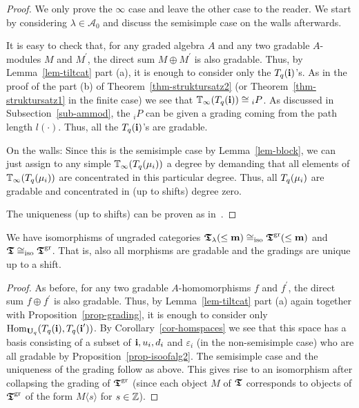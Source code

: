\begin{proof}
We only prove the $\infty$ case and leave 
the other case to the reader. We start by 
considering $\lambda\in\mathcal A_0$ and 
discuss the semisimple case on the walls afterwards.




It is easy to check that, for any graded algebra 
$A$ and any two gradable $A$-modules $M$ and 
$M^{\prime}$, the direct sum $M\oplus M^{\prime}$ 
is also gradable. Thus, by Lemma~\ref{lem-tiltcat} 
part (a), it is enough to consider only the 
$T_q({\boldsymbol{\mathrm{i}}})$'s. As in the proof of the part (b) 
of Theorem~\ref{thm-struktursatz2} 
(or Theorem~\ref{thm-struktursatz1} in the finite case) 
we see that $\mathbb{T}_{\infty}(T_q({\boldsymbol{\mathrm{i}}}))\cong {}_iP$. As discussed 
in Subsection~\ref{sub-ammod}, the ${}_iP$ can be given 
a grading coming from the path length $l(\cdot)$. 
Thus, all the $T_q({\boldsymbol{\mathrm{i}}})$'s are gradable.




On the walls: Since this is the semisimple 
case by Lemma~\ref{lem-block}, we can just 
assign to any simple $\mathbb{T}_{\infty}(T_q({\mu_i}))$ a 
degree by demanding that all elements of 
$\mathbb{T}_{\infty}(T_q({\mu_i}))$ are concentrated in 
this particular degree. Thus, all 
$T_q({\mu_i})$ are gradable and concentrated in (up to shifts) degree zero.



The uniqueness (up to shifts) can be proven as in~\cite[Lemma~2.5.3]{bgs}.
\end{proof}



\begin{cor}\label{cor-gradings2}
We have isomorphisms of ungraded categories 
$\boldsymbol{\mathfrak{T}}_{\lambda}(\leq\boldsymbol{\mathrm{m}})\cong_{\mathrm{iso}}\boldsymbol{\mathfrak{T}}^{\mathrm{gr}}(\leq\boldsymbol{\mathrm{m}})$ 
and $\boldsymbol{\mathfrak{T}}\cong_{\mathrm{iso}}\boldsymbol{\mathfrak{T}}^{\mathrm{gr}}$. That is, 
also all morphisms are gradable and the gradings are unique up to a shift.\makeqed
\end{cor}



\begin{proof}
As before, for any 
two gradable $A$-homomorphisms $f$ and 
$f^{\prime}$, the direct sum $f\oplus f^{\prime}$ 
is also gradable. Thus, by Lemma~\ref{lem-tiltcat} 
part (a) again together with Proposition~\ref{prop-grading}, 
it is enough to consider only 
$\mathrm{Hom}_{\boldsymbol{\mathrm{U}}_q}(T_q({\boldsymbol{\mathrm{i}}}),T_q({\boldsymbol{\mathrm{i}}^{\prime}}))$. 
By Corollary~\ref{cor-homspaces} we see that 
this space has a basis consisting of a subset 
of $\boldsymbol{\mathrm{i}},u_i,d_i$ and $\varepsilon_i$ (in the non-semisimple case) who are all gradable by Proposition~\ref{prop-isoofalg2}. The semisimple 
case and the uniqueness of the grading follow as 
above. This gives rise to an 
isomorphism after collapsing the grading of $\boldsymbol{\mathfrak{T}}^{\mathrm{gr}}$ 
(since each object $M$ of $\boldsymbol{\mathfrak{T}}$ corresponds to objects of $\boldsymbol{\mathfrak{T}}^{\mathrm{gr}}$ 
of the form $M\langle s\rangle$ for $s\in\mathbb{Z}$).
\end{proof}



